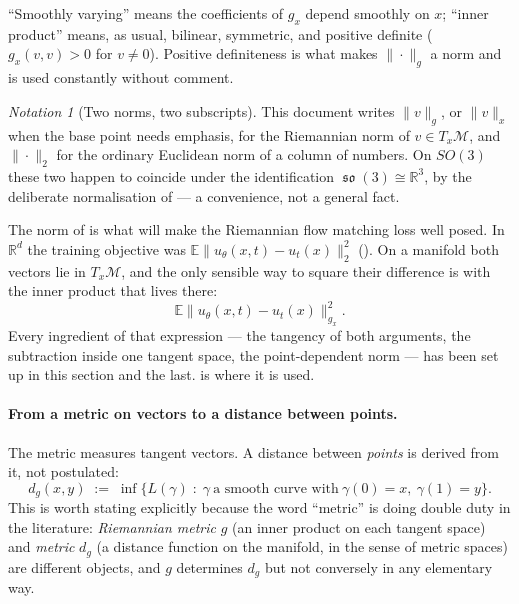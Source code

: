 \documentclass[11pt,a4paper]{report}
\theoremstyle{definition}
\theoremstyle{remark}
\newtheorem{notation}[notation]{Notation}
\DeclareMathOperator{\so}{\mathfrak{so}}
\newcommand{\RR}{\mathbb R}
\newcommand{\EE}{\mathbb E}
\begin{document}
``Smoothly varying'' means the coefficients of $g_x$ depend smoothly on $x$;
``inner product'' means, as usual, bilinear, symmetric, and positive
definite ($g_x(v,v)>0$ for $v\ne0$). Positive definiteness is what makes
$\|\cdot\|_g$ a norm and is used constantly without comment.

\begin{notation}[Two norms, two subscripts]
\label{not:norm-subscripts}
This document writes $\|v\|_g$, or $\|v\|_x$ when the base point needs
emphasis, for the Riemannian norm of $v\in T_x\mathcal M$, and
$\|\cdot\|_2$ for the ordinary Euclidean norm of a column of numbers. On
$SO(3)$ these two happen to coincide under the identification
$\so(3)\cong\RR^3$, by the deliberate normalisation of
 --- a convenience, not a general fact.
\end{notation}

\begin{tcolorbox}[colback=blue!3,colframe=blue!40!black,title=Where this is heading]
The norm of  is what will make the Riemannian
flow matching loss well posed. In $\RR^d$ the training objective was
$\EE\|u_\theta(x,t)-u_t(x)\|_2^2$ (). On
a manifold both vectors lie in $T_x\mathcal M$, and the only sensible way to
square their difference is with the inner product that lives there:
\[
\EE\bigl\|u_\theta(x,t)-u_t(x)\bigr\|^2_{g_x} .
\]
Every ingredient of that expression --- the tangency of both arguments, the
subtraction inside one tangent space, the point-dependent norm --- has been
set up in this section and the last.  is where it is
used.
\end{tcolorbox}

\paragraph{From a metric on vectors to a distance between points.} The
metric measures tangent vectors. A distance between \emph{points} is
derived from it, not postulated:
\begin{equation}
\label{eq:riemannian-distance}
d_g(x,y) \;:=\; \inf\bigl\{L(\gamma)\;:\;\gamma\ \text{a smooth curve with}\ \gamma(0)=x,\ \gamma(1)=y\bigr\} .
\end{equation}
This is worth stating explicitly because the word ``metric'' is doing double
duty in the literature: \emph{Riemannian metric} $g$ (an inner product on
each tangent space) and \emph{metric} $d_g$ (a distance function on the
manifold, in the sense of metric spaces) are different objects, and $g$
determines $d_g$ but not conversely in any elementary way.
\end{document}
